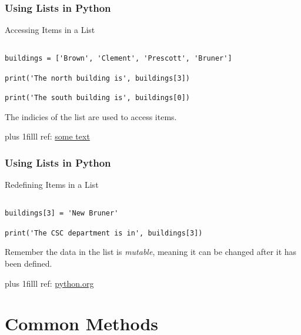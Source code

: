 \documentclass[fleqn]{beamer} %
\newcommand{\sectiontitleII}{Using Lists in Python}
\newcommand{\sectiontitleIII}{Common Methods}
\newcommand{\btVFill}{\vskip0pt plus 1filll}
\begin{document}
	\begin{frame}[containsverbatim] \small
		\frametitle{\sectiontitleII}
		
		Accessing Items in a List	

		\begin{lstlisting}

buildings = ['Brown', 'Clement', 'Prescott', 'Bruner']

print('The north building is', buildings[3])

print('The south building is', buildings[0])
		\end{lstlisting}
\vspace*{5mm}
The indicies of the list are used to access items.

		\btVFill
		\tiny{ref: \href{some link}{some text}}
	\end{frame}	

	\begin{frame}[containsverbatim] \small
		\frametitle{\sectiontitleII}
		
		Redefining Items in a List	

		\begin{lstlisting}

buildings[3] = 'New Bruner'

print('The CSC department is in', buildings[3])

		\end{lstlisting}


		\vspace*{10mm}
		Remember the data in the list is {\it mutable}, meaning it can be changed after it has been defined.
	

		\btVFill
		\tiny{ref: \href{https://docs.python.org/3/tutorial/datastructures.html#more-on-lists}{python.org}}
	\end{frame}	


\section{\sectiontitleIII}
\end{document}
